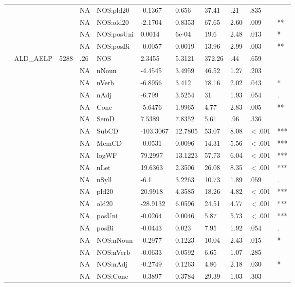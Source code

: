 \begin{table}[ht]
\begin{tabular}{lllllllllll}
   &  &  & NA & NOS:pld20 & -0.1367 & 0.656 & 37.41 & .21 & .835 &   \\ 
   &  &  & NA & NOS:old20 & -2.1704 & 0.8353 & 67.65 & 2.60 & .009 & ** \\ 
   &  &  & NA & NOS:posUni & 0.0014 & 6e-04 & 19.6 & 2.48 & .013 & * \\ 
   &  &  & NA & NOS:posBi & -0.0057 & 0.0019 & 13.96 & 2.99 & .003 & ** \\ 
   & ALD\_AELP & 5288 & .26 & NOS & 2.3455 & 5.3121 & 372.26 & .44 & .659 &   \\ 
   &  &  & NA & nNoun & -4.4545 & 3.4959 & 46.52 & 1.27 & .203 &   \\ 
   &  &  & NA & nVerb & -6.8956 & 3.412 & 78.16 & 2.02 & .043 & * \\ 
   &  &  & NA & nAdj & -6.799 & 3.5254 & 31 & 1.93 & .054 & . \\ 
   &  &  & NA & Conc & -5.6476 & 1.9965 & 4.77 & 2.83 & .005 & ** \\ 
   &  &  & NA & SemD & 7.5389 & 7.8352 & 5.61 & .96 & .336 &   \\ 
   &  &  & NA & SubCD & -103.3067 & 12.7805 & 53.07 & 8.08 & $<$.001 & *** \\ 
   &  &  & NA & MemCD & -0.0531 & 0.0096 & 14.31 & 5.56 & $<$.001 & *** \\ 
   &  &  & NA & logWF & 79.2997 & 13.1223 & 57.73 & 6.04 & $<$.001 & *** \\ 
   &  &  & NA & nLet & 19.6363 & 2.3506 & 26.08 & 8.35 & $<$.001 & *** \\ 
   &  &  & NA & nSyll & -6.1 & 3.2263 & 10.73 & 1.89 & .059 & . \\ 
   &  &  & NA & pld20 & 20.9918 & 4.3585 & 18.26 & 4.82 & $<$.001 & *** \\ 
   &  &  & NA & old20 & -28.9132 & 6.0596 & 24.51 & 4.77 & $<$.001 & *** \\ 
   &  &  & NA & posUni & -0.0264 & 0.0046 & 5.87 & 5.73 & $<$.001 & *** \\ 
   &  &  & NA & posBi & -0.0443 & 0.023 & 7.95 & 1.92 & .054 & . \\ 
   &  &  & NA & NOS:nNoun & -0.2977 & 0.1223 & 10.04 & 2.43 & .015 & * \\ 
   &  &  & NA & NOS:nVerb & -0.0633 & 0.0592 & 6.65 & 1.07 & .285 &   \\ 
   &  &  & NA & NOS:nAdj & -0.2749 & 0.1263 & 4.86 & 2.18 & .030 & * \\ 
   &  &  & NA & NOS:Conc & -0.3897 & 0.3784 & 29.39 & 1.03 & .303 &   \\ 

\end{tabular}
\end{table}
